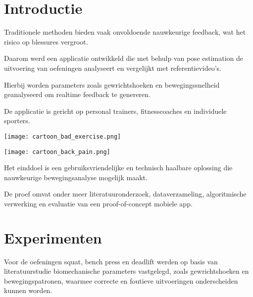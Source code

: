 \documentclass[a0,portrait]{hogent-poster}
\begin{document}
\begin{multicols}{2} %

\section{Introductie}

\noindent
\begin{minipage}[t]{0.48\linewidth}
  Traditionele methoden bieden vaak onvoldoende nauwkeurige feedback, wat het risico op blessures vergroot. 

Daarom werd een applicatie ontwikkeld die met behulp van pose estimation de uitvoering van oefeningen analyseert en vergelijkt met referentievideo’s. 

Hierbij worden parameters zoals gewrichtshoeken en bewegingssnelheid geanalyseerd om realtime feedback te genereren. 

De applicatie is gericht op personal trainers, fitnesscoaches en individuele sporters. 
\end{minipage}
\hfill
\begin{minipage}[t]{0.48\linewidth}
\texttt{[image: cartoon\_bad\_exercise.png]}
\end{minipage}
\vspace{1em}


\noindent
\begin{minipage}[t]{0.48\linewidth}
\texttt{[image: cartoon\_back\_pain.png]}
\end{minipage}
\hfill
\begin{minipage}[t]{0.48\linewidth}

Het einddoel is een gebruiksvriendelijke en technisch haalbare oplossing die nauwkeurige bewegingsanalyse mogelijk maakt. 

De proef omvat onder meer literatuuronderzoek, dataverzameling, algoritmische verwerking en evaluatie van een proof-of-concept mobiele app.
\end{minipage}
\vspace{1em}

\section{Experimenten}

\noindent
\begin{minipage}[t]{0.48\linewidth}

 Voor de oefeningen squat, bench press en deadlift werden op basis van literatuurstudie biomechanische parameters vastgelegd, zoals gewrichtshoeken en bewegingspatronen, waarmee correcte en foutieve uitvoeringen onderscheiden kunnen worden. 


\end{minipage}
\end{multicols}
\end{document}

